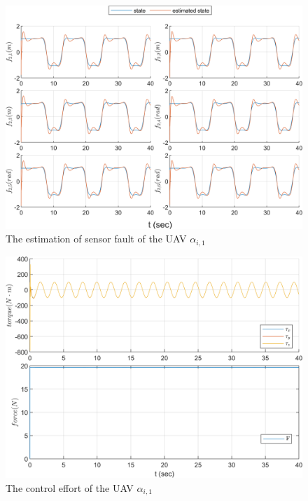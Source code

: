 \documentclass{ieeeaccess}
\begin{document}
\begin{figure}[htbp]
    \centering
    \includegraphics[scale=.57]{fig/uav (3).png}\caption{The estimation of sensor fault of the UAV $\alpha_{i,1}$}%
    \label{fig:UAV, fs}
\end{figure}
\begin{figure}[htbp]
    \centering
    \includegraphics[scale=.57]{fig/uav (4).png}\caption{The control effort of the UAV $\alpha_{i,1}$}%
    \label{fig:UAV, control}
\end{figure}
\end{document}
